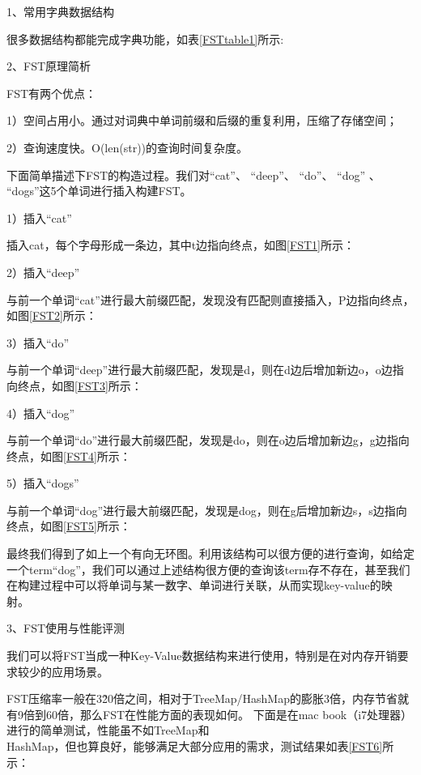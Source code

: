 1、常用字典数据结构

很多数据结构都能完成字典功能，如表\ref{FSTtable1}所示:


2、FST原理简析

FST有两个优点：

1）空间占用小。通过对词典中单词前缀和后缀的重复利用，压缩了存储空间；

2）查询速度快。O(len(str))的查询时间复杂度。

下面简单描述下FST的构造过程。我们对“cat”、 “deep”、 “do”、 “dog” 、\\
“dogs”这5个单词进行插入构建FST。

1）插入“cat”

插入cat，每个字母形成一条边，其中t边指向终点，如图\ref{FST1}所示：


2）插入“deep”

与前一个单词“cat”进行最大前缀匹配，发现没有匹配则直接插入，P边指向终点，如图\ref{FST2}所示：


3）插入“do”

与前一个单词“deep”进行最大前缀匹配，发现是d，则在d边后增加新边o，o边指向终点，如图\ref{FST3}所示：


4）插入“dog”

与前一个单词“do”进行最大前缀匹配，发现是do，则在o边后增加新边g，g边指向终点，如图\ref{FST4}所示：


5）插入“dogs”

与前一个单词“dog”进行最大前缀匹配，发现是dog，则在g后增加新边s，s边指向终点，如图\ref{FST5}所示：


最终我们得到了如上一个有向无环图。利用该结构可以很方便的进行查询，如给定一个term“dog”，我们可以通过上述结构很方便的查询该term存不存在，甚至我们在构建过程中可以将单词与某一数字、单词进行关联，从而实现key-value的映射。

3、FST使用与性能评测

我们可以将FST当成一种Key-Value数据结构来进行使用，特别是在对内存开销要求较少的应用场景。

FST压缩率一般在3\~20倍之间，相对于TreeMap/HashMap的膨胀3倍，内存节省就有9倍到60倍，那么FST在性能方面的表现如何。
下面是在mac book（i7处理器）进行的简单测试，性能虽不如TreeMap和\\HashMap，但也算良好，能够满足大部分应用的需求，测试结果如表\ref{FST6}所示：

